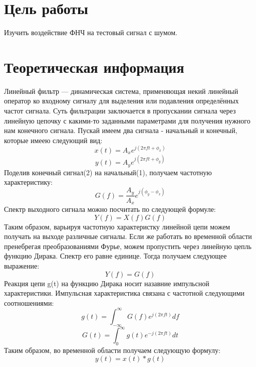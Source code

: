 
\usepackage{amsmath}







\section{Цель работы}
Изучить воздействие ФНЧ на тестовый сигнал с шумом.


\section{Теоретическая информация}
Линейный фильтр — динамическая система, применяющая некий линейный оператор ко входному сигналу для выделения или подавления определённых частот сигнала. Суть фильтрации заключается в пропускании сигнала через линейную цепочку с какими-то заданными параметрами для получения нужного нам конечного сигнала.
Пускай имеем два сигнала - начальный и конечный, которые имеею следующий вид:
\begin{equation}x(t) = A_x e^{j(2\pi ft+\phi_x)}\end{equation}
\begin{equation}y(t) = A_y e^{j(2\pi ft+\phi_y)}\end{equation}
Поделив конечный сигнал(2) на начальный(1), получаем частотную характеристику:
\begin{equation}G(f) = \frac{A_y}{A_x} e^{j(\phi_y - \phi_x)}\end{equation}
Спектр выходного сигнала можно посчитать по следующей формуле:
\begin{equation}Y(f) = X(f) G(f)\end{equation}
Таким образом, варьируя частотную характеристку линейной цепи можем получать на выходе различные сигналы.
Если же работать во временной области пренебрегая преобразованиями Фурье, можем пропустить через линейную цепль функцию Дирака. Спектр его равне единице.
Тогда получаем следующее выражение:
\begin{equation}Y(f) =  G(f)\end{equation}
Реакция цепи g(t) на функцию Дирака носит назавние импульсной характеристики. Импульсная характеристика связана с частотной следующими соотношениями:
\begin{equation}g(t) =  \int_{-\infty}^{\infty} G(f) e^{j(2\pi ft)}df \end{equation}
\begin{equation}G(t) =  \int_{0}^{\infty} g(t) e^{-j(2\pi ft)}dt \end{equation}
Таким образом, во временной области получаем следующую формулу:
\begin{equation}y(t) =  x(t) * g(t)\end{equation}

